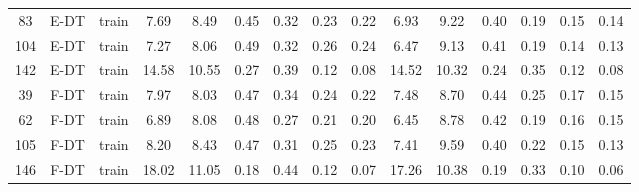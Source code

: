 \begin{table}
\begin{tabular}{@{\hskip3pt}c@{\hskip3pt}c@{\hskip3pt}c@{\hskip3pt}c@{\hskip3pt}c@{\hskip3pt}c@{\hskip3pt}c@{\hskip3pt}c@{\hskip3pt}c@{\hskip3pt}c@{\hskip3pt}c@{\hskip3pt}c@{\hskip3pt}c@{\hskip3pt}c@{\hskip3pt}c}
         83 &           E-DT &                     train &              7.69 &        8.49 &          0.45 &        0.32 &        0.23 &         0.22 &                6.93 &        9.22 &          0.40 &        0.19 &        0.15 &         0.14 \\
        104 &           E-DT &                     train &              7.27 &        8.06 &          0.49 &        0.32 &        0.26 &         0.24 &                6.47 &        9.13 &          0.41 &        0.19 &        0.14 &         0.13 \\
        142 &           E-DT &                     train &             14.58 &       10.55 &          0.27 &        0.39 &        0.12 &         0.08 &               14.52 &       10.32 &          0.24 &        0.35 &        0.12 &         0.08 \\
         39 &           F-DT &                     train &              7.97 &        8.03 &          0.47 &        0.34 &        0.24 &         0.22 &                7.48 &        8.70 &          0.44 &        0.25 &        0.17 &         0.15 \\
         62 &           F-DT &                     train &              6.89 &        8.08 &          0.48 &        0.27 &        0.21 &         0.20 &                6.45 &        8.78 &          0.42 &        0.19 &        0.16 &         0.15 \\
        105 &           F-DT &                     train &              8.20 &        8.43 &          0.47 &        0.31 &        0.25 &         0.23 &                7.41 &        9.59 &          0.40 &        0.22 &        0.15 &         0.13 \\
        146 &           F-DT &                     train &             18.02 &       11.05 &          0.18 &        0.44 &        0.12 &         0.07 &               17.26 &       10.38 &          0.19 &        0.33 &        0.10 &         0.06 \\
\bottomrule
\end{tabular}
\end{table}
